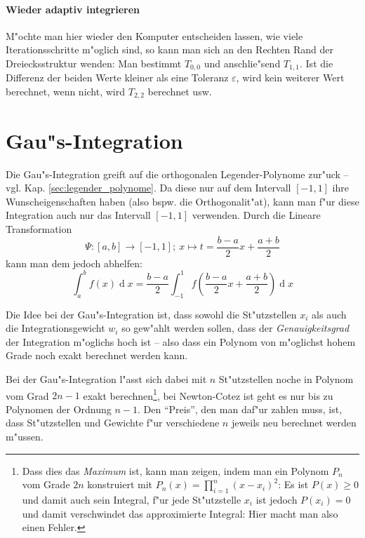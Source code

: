 \documentclass[a4paper]{book}
\newcommand{\abs}{\bigskip \noindent}
\newcommand{\diff}{\ensuremath{\operatorname d}}
\begin{document}
\paragraph{Wieder adaptiv integrieren}
\label{sec:wieder_adaptiv_integrieren}

M"ochte man hier wieder den Komputer entscheiden lassen, wie viele
Iterationsschritte m"oglich sind, so kann man sich an den Rechten Rand
der Dreiecksstruktur wenden: Man bestimmt $T_{0,0}$ und anschlie"send
$T_{1,1}$. Ist die Differenz der beiden Werte kleiner als eine
Toleranz $\varepsilon$, wird kein weiterer Wert berechnet, wenn nicht,
wird $T_{2,2}$ berechnet usw.








\section{Gau"s-Integration}
\label{sec:gaus_integration}

Die Gau"s-Integration greift auf die orthogonalen Legender-Polynome
zur"uck -- vgl. Kap. \ref{sec:legender_polynome}. Da diese nur auf dem
Intervall $[-1,1]$ ihre Wunscheigenschaften haben (also bspw. die
Orthogonalit"at), kann man f"ur diese Integration auch nur das
Intervall $[-1,1]$ verwenden. Durch die Lineare Transformation
\begin{equation}
  \label{eq:66}
  \Psi : [a,b] \to [-1,1]; ~ x \mapsto t = \frac{b-a}{2}x + \frac{a+b}{2}
\end{equation}
kann man dem jedoch abhelfen:
\begin{equation}
  \label{eq:67}
  \int_a^b f(x) \diff x =
\frac{b-a}{2} \int_{-1}^1 f(\frac{b-a}{2}x + \frac{a+b}{2}) \diff x
\end{equation}


\abs
Die Idee bei der Gau"s-Integration ist, dass sowohl die St"utzstellen
$x_i$ als auch die Integrationsgewicht $w_i$ so gew"ahlt werden
sollen, dass der \emph{Genauigkeitsgrad} der Integration m"oglichs
hoch ist -- also dass ein Polynom von m"oglichst hohem Grade noch
exakt berechnet werden kann. 

Bei der Gau"s-Integration l"asst sich dabei mit $n$ St"utzstellen
noche in Polynom vom Grad $2n-1$ exakt berechnen\footnote{Dass dies
  das \emph{Maximum} ist, kann man
zeigen, indem man ein Polynom $P_n$ vom Grade $2n$ konstruiert mit
$P_n(x) = \prod_{i=1}^n (x-x_i)^2$: Es ist $P(x) \geq 0$ und damit
auch sein Integral, f"ur jede St"utzstelle $x_i$ ist jedoch $P(x_i) =
0$ und damit verschwindet das approximierte Integral: Hier macht man
also einen Fehler.}, bei Newton-Cotez ist
geht es nur bis zu Polynomen der Ordnung $n-1$. Den "`Preis"', den man
daf"ur zahlen muss, ist, dass St"utzstellen und Gewichte f"ur
verschiedene $n$ jeweils neu berechnet werden m"ussen.
\end{document}
